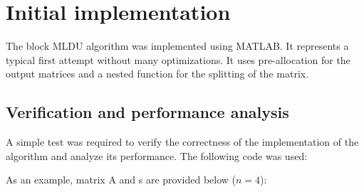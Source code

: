 \chapter{Initial implementation}



\noindent The block MLDU algorithm was implemented using MATLAB. It represents a typical first attempt without many optimizations. It uses pre-allocation for the output matrices and a nested function for the splitting of the matrix.

\section{Verification and performance analysis}

A simple test was required to verify the correctness of the implementation of the algorithm and analyze its performance. The following code was used:




\vspace{5mm}

\newpage
\noindent As an example, matrix A and s are provided below ($n = 4$): 

